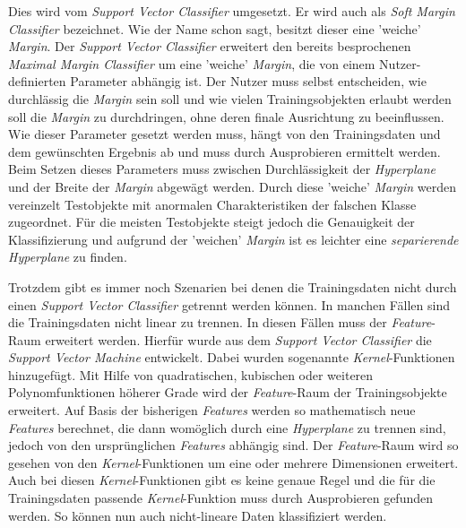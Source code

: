 Dies wird vom \textit{Support Vector Classifier} umgesetzt. Er wird auch als \textit{Soft Margin Classifier} bezeichnet.
Wie der Name schon sagt, besitzt dieser eine 'weiche' \textit{Margin}. 
Der \textit{Support Vector Classifier} erweitert den bereits besprochenen \textit{Maximal Margin Classifier}
um eine 'weiche' \textit{Margin}, die von einem Nutzer-definierten Parameter abhängig ist.
Der Nutzer muss selbst entscheiden, wie durchlässig die \textit{Margin} sein soll und
wie vielen Trainingsobjekten erlaubt werden soll die \textit{Margin} zu durchdringen, ohne deren finale Ausrichtung zu beeinflussen.
Wie dieser Parameter gesetzt werden muss, hängt von den Trainingsdaten und dem gewünschten Ergebnis ab
und muss durch Ausprobieren ermittelt werden.
Beim Setzen dieses Parameters muss zwischen Durchlässigkeit der \textit{Hyperplane} und der Breite der \textit{Margin} abgewägt werden.
Durch diese 'weiche' \textit{Margin} werden vereinzelt Testobjekte mit anormalen Charakteristiken der falschen Klasse
zugeordnet. Für die meisten Testobjekte steigt jedoch die Genauigkeit der Klassifizierung und aufgrund der 'weichen' \textit{Margin}
ist es leichter eine \textit{separierende Hyperplane} zu finden.\cite[S. 1566]{noble_2006}

Trotzdem gibt es immer noch Szenarien bei denen die Trainingsdaten nicht durch einen \textit{Support Vector Classifier} getrennt
werden können. In manchen Fällen sind die Trainingsdaten nicht linear zu trennen.
In diesen Fällen muss der \textit{Feature}-Raum erweitert werden. Hierfür wurde aus dem \textit{Support Vector Classifier}
die \textit{Support Vector Machine} entwickelt. Dabei wurden sogenannte \textit{Kernel}-Funktionen hinzugefügt.
Mit Hilfe von quadratischen, kubischen oder weiteren Polynomfunktionen höherer Grade wird der \textit{Feature}-Raum der
Trainingsobjekte erweitert. Auf Basis der bisherigen \textit{Features} werden so mathematisch neue \textit{Features} berechnet, die 
dann womöglich durch eine \textit{Hyperplane} zu trennen sind, jedoch von den ursprünglichen \textit{Features} abhängig sind.
Der \textit{Feature}-Raum wird so gesehen von den \textit{Kernel}-Funktionen um eine oder mehrere Dimensionen erweitert.
Auch bei diesen \textit{Kernel}-Funktionen gibt es keine genaue Regel und die für die Trainingsdaten passende 
\textit{Kernel}-Funktion muss durch Ausprobieren gefunden werden. So können nun auch nicht-lineare Daten klassifiziert werden.
\cite[S. 1566f.]{noble_2006}\cite[S. 224 - 227]{suthaharan_2015}

